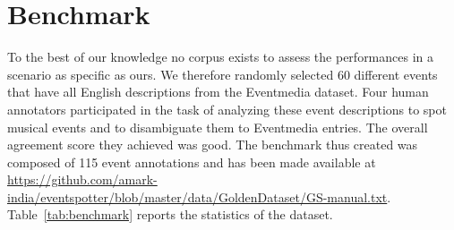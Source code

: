 \documentclass[10pt,a4paper]{article}
\begin{document}
%
%
%
%
%
%	
%
%	 


\section{Benchmark}
To the best of our knowledge no corpus exists to assess the performances in a scenario as specific as ours. We therefore randomly selected 60 different events that have all English descriptions from the Eventmedia dataset. Four human annotators participated in the task of analyzing these event descriptions to spot musical events and to disambiguate them to Eventmedia entries. The overall agreement score they achieved was good. The benchmark thus created was composed of 115 event annotations and has been made available at \url{https://github.com/amark-india/eventspotter/blob/master/data/GoldenDataset/GS-manual.txt}. Table~\ref{tab:benchmark} reports the statistics of the dataset.
\end{document}
